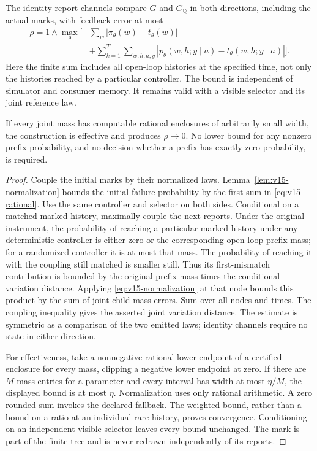 \begin{theorem}\label{thm:v15-rational}
The identity report channels compare $G$ and $G_{\mathbb Q}$ in both
directions, including the actual marks, with feedback error at most
\begin{align}\label{eq:v15-rational}
 \rho=1\wedge\max_\theta\bigg[&\sum_w|\pi_\theta(w)-t_\theta(w)|\\[-2mm]
 &+\sum_{k=1}^T\sum_{w,h,a,y}
       |p_\theta(w,h;y\mid a)-t_\theta(w,h;y\mid a)|\bigg].\nonumber
\end{align}
Here the finite sum includes all open-loop histories at the specified
time, not only the histories reached by a particular controller. The
bound is independent of simulator and consumer memory. It remains
valid with a visible selector and its joint reference law.

If every joint mass has computable rational enclosures of arbitrarily
small width, the construction is effective and produces $\rho\to0$.
No lower bound for any nonzero prefix probability, and no decision
whether a prefix has exactly zero probability, is required.
\end{theorem}
\begin{proof}
Couple the initial marks by their normalized laws. Lemma~\ref{lem:v15-normalization}
bounds the initial failure probability by the first sum in
\eqref{eq:v15-rational}. Use the same controller and selector on both
sides. Conditional on a matched marked history, maximally couple the
next reports. Under the original instrument, the probability of
reaching a particular marked history under any deterministic controller
is either zero or the corresponding open-loop prefix mass; for a
randomized controller it is at most that mass. The probability of
reaching it with the coupling still matched is smaller still. Thus
its first-mismatch contribution is bounded by the original prefix
mass times the conditional variation distance. Applying
\eqref{eq:v15-normalization} at that node bounds this product by the
sum of joint child-mass errors. Sum over all nodes and times. The
coupling inequality gives the asserted joint variation distance.
The estimate is symmetric as a comparison of the two emitted laws;
identity channels require no state in either direction.

For effectiveness, take a nonnegative rational lower endpoint of a
certified enclosure for every mass, clipping a negative lower endpoint
at zero. If there are $M$ mass entries for a parameter and every
interval has width at most $\eta/M$, the displayed bound is at most
$\eta$. Normalization uses only rational arithmetic. A zero rounded
sum invokes the declared fallback. The weighted bound, rather than a
bound on a ratio at an individual rare history, proves convergence.
Conditioning on an independent visible selector leaves every bound
unchanged. The mark is part of the finite tree and is never redrawn
independently of its reports.
\end{proof}

